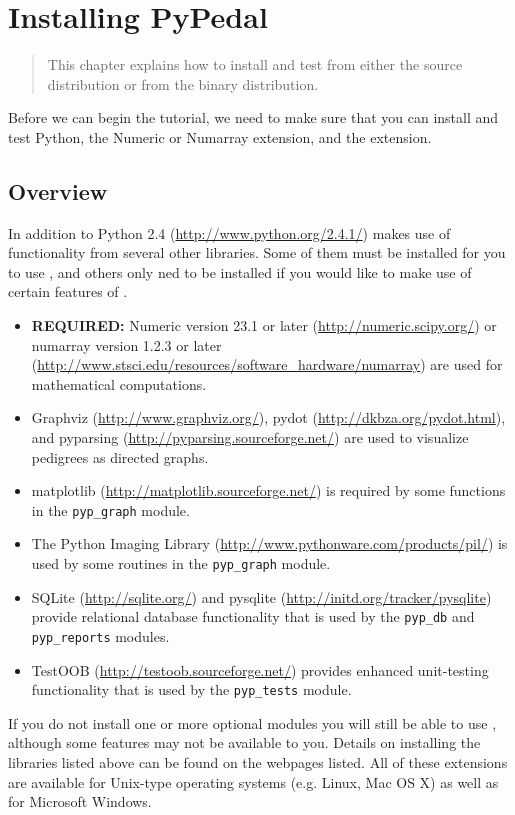 \chapter{Installing PyPedal}
\label{cha:installation}

\begin{quote}
This chapter explains how to install and test \PYPEDAL{} from either the source distribution or from the binary distribution.
\end{quote}

Before we can begin the tutorial, we need to make sure that you can install and test Python, the Numeric or Numarray extension, and the \PYPEDAL{} extension.

\section{Overview}

In addition to Python 2.4 (\url{http://www.python.org/2.4.1/}) \PYPEDAL{} makes use of functionality from several
other libraries.  Some of them must be installed for you to use \PYPEDAL{}, and others only ned to be installed if
you would like to make use of certain features of \PYPEDAL{}.
\begin{itemize}
\item \textbf{REQUIRED:} Numeric version 23.1 or later (\url{http://numeric.scipy.org/}) or numarray version 1.2.3 or later (\url{http://www.stsci.edu/resources/software_hardware/numarray}) are used for mathematical computations.
\item Graphviz (\url{http://www.graphviz.org/}), pydot (\url{http://dkbza.org/pydot.html}), and pyparsing (\url{http://pyparsing.sourceforge.net/}) are used to visualize pedigrees as directed graphs.
\item matplotlib (\url{http://matplotlib.sourceforge.net/}) is required by some functions in the \texttt{pyp_graph} module.
\item The Python Imaging Library (\url{http://www.pythonware.com/products/pil/}) is used by some routines in the \texttt{pyp_graph} module.
\item SQLite (\url{http://sqlite.org/}) and pysqlite (\url{http://initd.org/tracker/pysqlite}) provide relational database functionality that is used by the \texttt{pyp_db} and \texttt{pyp_reports} modules.
\item TestOOB (\url{http://testoob.sourceforge.net/}) provides enhanced unit-testing functionality that is used by the \texttt{pyp_tests} module.
\end{itemize}
If you do not install one or more optional modules you will still be able to use \PYPEDAL{}, although some features may not be available to you.  Details on installing the libraries listed above can be found on the webpages listed.  All of these extensions are available for Unix-type operating systems (e.g. Linux, Mac OS X) as well as for Microsoft Windows.


